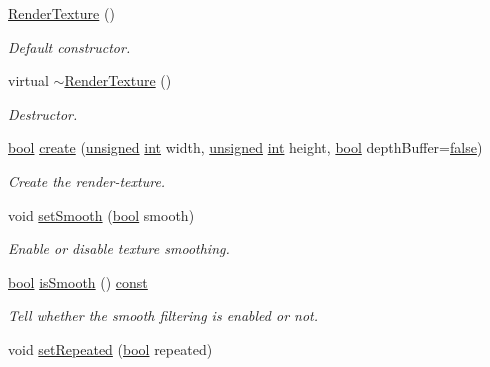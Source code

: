 \begin{DoxyCompactItemize}
\hyperlink{classsf_1_1_render_texture_a19ee6e5b4c40ad251803389b3953a9c6}{Render\-Texture} ()
\begin{DoxyCompactList}\small\item\em Default constructor. \end{DoxyCompactList}\item 
virtual \hyperlink{classsf_1_1_render_texture_a94b84ab9335be84d2a014c964d973304}{$\sim$\-Render\-Texture} ()
\begin{DoxyCompactList}\small\item\em Destructor. \end{DoxyCompactList}\item 
\hyperlink{term__entry_8h_a002004ba5d663f149f6c38064926abac}{bool} \hyperlink{classsf_1_1_render_texture_aefbb76eb3b87e368ab974b2660931ccb}{create} (\hyperlink{curses_8priv_8h_aca40206900cfc164654362fa8d4ad1e6}{unsigned} \hyperlink{term__entry_8h_ad65b480f8c8270356b45a9890f6499ae}{int} width, \hyperlink{curses_8priv_8h_aca40206900cfc164654362fa8d4ad1e6}{unsigned} \hyperlink{term__entry_8h_ad65b480f8c8270356b45a9890f6499ae}{int} height, \hyperlink{term__entry_8h_a002004ba5d663f149f6c38064926abac}{bool} depth\-Buffer=\hyperlink{_snake_8cpp_ae6c865df784842196d411c1466b01686}{false})
\begin{DoxyCompactList}\small\item\em Create the render-\/texture. \end{DoxyCompactList}\item 
void \hyperlink{classsf_1_1_render_texture_af08991e63c6020865dd07b20e27305b6}{set\-Smooth} (\hyperlink{term__entry_8h_a002004ba5d663f149f6c38064926abac}{bool} smooth)
\begin{DoxyCompactList}\small\item\em Enable or disable texture smoothing. \end{DoxyCompactList}\item 
\hyperlink{term__entry_8h_a002004ba5d663f149f6c38064926abac}{bool} \hyperlink{classsf_1_1_render_texture_ae385f4f4dbd2af50fb11947bf0bcb83d}{is\-Smooth} () \hyperlink{term__entry_8h_a57bd63ce7f9a353488880e3de6692d5a}{const} 
\begin{DoxyCompactList}\small\item\em Tell whether the smooth filtering is enabled or not. \end{DoxyCompactList}\item 
void \hyperlink{classsf_1_1_render_texture_af8f97b33512bf7d5b6be3da6f65f7365}{set\-Repeated} (\hyperlink{term__entry_8h_a002004ba5d663f149f6c38064926abac}{bool} repeated)

\end{DoxyCompactItemize}
